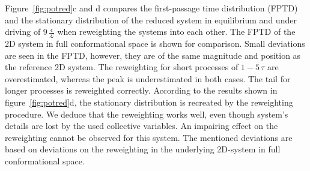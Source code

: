 Figure~\ref{fig:potred}c and d compares the first-passage time distribution (FPTD) and the stationary distribution of the reduced system in equilibrium and under driving of $9\,\frac{\epsilon}{\mathcal{L}}$ when reweighting the systems into each other.  The FPTD of the 2D system in full conformational space is shown for comparison. Small deviations are seen in the FPTD, however, they are of the same magnitude and position as the reference 2D system. The reweighting for short processes of $1-5\,\tau$ are overestimated, whereas the peak is underestimated in both cases. The tail for longer processes is reweighted correctly. According to the results shown in figure~\ref{fig:potred}d, the stationary distribution is recreated by the reweighting procedure.  We deduce that the reweighting works well, even though system's details are lost by the used collective variables. An impairing effect on the reweighting cannot be observed for this system.  The mentioned deviations are based on deviations on the reweighting in the underlying 2D-system in full conformational space.
